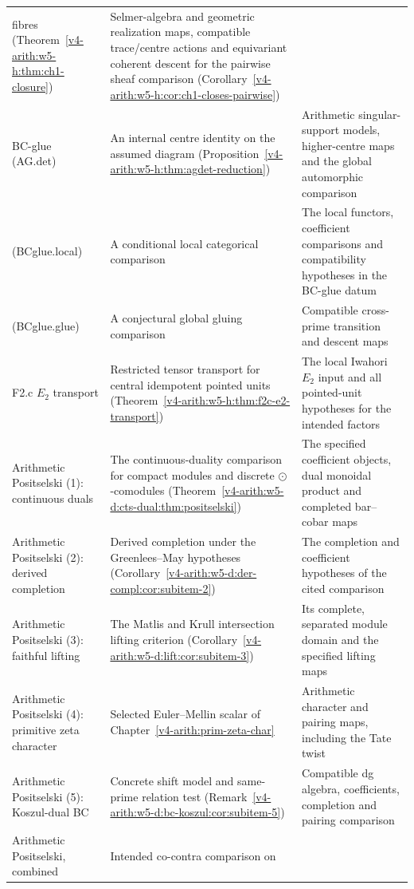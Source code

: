 \begin{longtable}{@{}p{}|p{}|p{}@{}}
fibres (Theorem~\ref{v4-arith:w5-h:thm:ch1-closure}) & Selmer-algebra and
geometric realization maps, compatible trace/centre actions and
equivariant coherent descent for the pairwise sheaf comparison
(Corollary~\ref{v4-arith:w5-h:cor:ch1-closes-pairwise}) \\
BC-glue (AG.det) & An internal centre identity on the assumed diagram
(Proposition~\ref{v4-arith:w5-h:thm:agdet-reduction}) & Arithmetic singular-support
models, higher-centre maps and the global automorphic comparison \\
(BCglue.local) & A conditional local categorical comparison & The
local functors, coefficient comparisons and compatibility hypotheses
in the BC-glue datum \\
(BCglue.glue) & A conjectural global gluing comparison & Compatible
cross-prime transition and descent maps \\
F2.c \(E_2\) transport & Restricted tensor transport for central
idempotent pointed units
(Theorem~\ref{v4-arith:w5-h:thm:f2c-e2-transport}) & The local Iwahori
\(E_2\) input and all pointed-unit hypotheses for the intended factors \\
Arithmetic Positselski (1): continuous duals & The continuous-duality
comparison for compact modules and discrete \(\odot\)-comodules
(Theorem~\ref{v4-arith:w5-d:cts-dual:thm:positselski}) & The specified
coefficient objects, dual monoidal product and completed bar--cobar maps \\
Arithmetic Positselski (2): derived completion & Derived completion
under the Greenlees--May hypotheses
(Corollary~\ref{v4-arith:w5-d:der-compl:cor:subitem-2}) & The completion and
coefficient hypotheses of the cited comparison \\
Arithmetic Positselski (3): faithful lifting & The Matlis and Krull
intersection lifting criterion
(Corollary~\ref{v4-arith:w5-d:lift:cor:subitem-3}) & Its complete, separated
module domain and the specified lifting maps \\
Arithmetic Positselski (4): primitive zeta character & Selected
Euler--Mellin scalar of Chapter~\ref{v4-arith:prim-zeta-char} &
Arithmetic character and pairing maps, including the Tate twist \\
Arithmetic Positselski (5): Koszul-dual BC & Concrete shift model and
same-prime relation test
(Remark~\ref{v4-arith:w5-d:bc-koszul:cor:subitem-5}) & Compatible dg algebra,
coefficients, completion and pairing comparison \\
Arithmetic Positselski, combined & Intended co-contra comparison on

\end{longtable}
